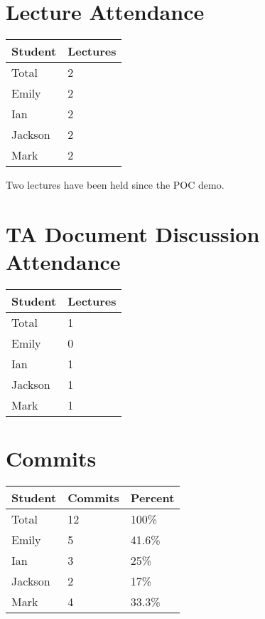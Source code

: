 \documentclass{article}
\begin{document}
\section{Lecture Attendance}

\begin{table}[H]
\centering
\begin{tabular}{ll}
\toprule
\textbf{Student} & \textbf{Lectures}\\
\midrule
Total & 2\\
Emily & 2\\
Ian & 2\\
Jackson & 2\\
Mark & 2\\
\bottomrule
\end{tabular}
\end{table}

Two lectures have been held since the POC demo.

\section{TA Document Discussion Attendance}

\begin{table}[H]
\centering
\begin{tabular}{ll}
\toprule
\textbf{Student} & \textbf{Lectures}\\
\midrule
Total & 1\\
Emily & 0\\
Ian & 1\\
Jackson & 1\\
Mark & 1\\
\bottomrule
\end{tabular}
\end{table}

\section{Commits}

\begin{table}[H]
\centering
\begin{tabular}{lll}
\toprule
\textbf{Student} & \textbf{Commits} & \textbf{Percent}\\
\midrule
Total & 12 & 100\% \\
Emily & 5 & 41.6\%\\
Ian & 3 & 25\%\\
Jackson & 2 & 17\%\\
Mark & 4 & 33.3\%\\
\bottomrule
\end{tabular}
\end{table}
\end{document}
